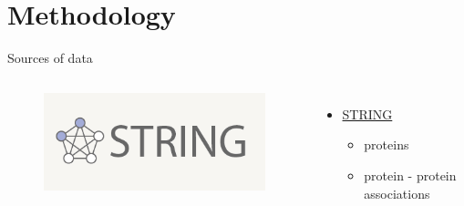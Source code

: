 \documentclass{beamer}
\begin{document}
\section{Methodology}
\begin{frame}{Sources of data}
\begin{columns}[c] %

\begin{figure}
    \centering
    \includegraphics[width=1\linewidth]{string_logo.png}
\end{figure}
\begin{itemize}
    \item \href{https://string-db.org/}{STRING}
    \begin{itemize}
        \item proteins
        \item protein - protein associations
    \end{itemize}
\end{itemize}


\end{columns}
\end{frame}
\end{document}
